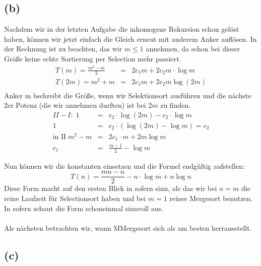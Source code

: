 \documentclass[11pt,a4paper,ngerman]{article}
\begin{document}


\subsection*{(b)}

Nachdem wir in der letzten Aufgabe die inhomogene Rekursion schon gelöst haben, können wir jetzt einfach die Gleich erneut mit anderem Anker auflösen.
In der Rechnung ist zu beachten, das wir $m \leq 1$ annehmen, da schon bei dieser Größe keine echte Sortierung per Selection mehr passiert.
$$
\begin{array}{rcl}
T(m)= \frac{m^2 - m}{2} &=&  2 c_1 m + 2 c_2 m \cdot \log m\\
T(2m) = m^2 + m &=& 2c_1 m + 2c_2 m \log (2m)\\
\end{array}
$$
Anker m bschreibt die Größe, wenn wir Selektionsort ausführen und die nächste 2er Potenz (die wir annehmen durften) ist bei $2m$ zu finden.
$$
\begin{array}{rcl}
II - I:\;1 &=& c_2 \cdot \log(2m) - c_2 \cdot \log m\\
1 &=& c_2 \cdot \left( \log (2m) - \log m\right)= c_2\\
\text{in II}\; m^2 - m &=& 2c_1 \cdot m + 2m\log m\\
c_1 &=& \frac{m-1}{2} - \log m
\end{array}
$$

Nun können wir die konstanten einsetzen und die Formel endgültig aufstellen:
$$
T(n) = \frac{mn - n}{2} - n \cdot \log m + n \log n
$$
Diese Form macht auf den ersten Blick in sofern sinn, als das wir bei $n = m$ die reine Laufzeit für Selectionsort haben und bei $m=1$ reines Mergesort benutzen. In sofern schaut die Form schoneinmal sinnvoll aus.\\
\vspace{\baselineskip}\\

Als nächsten betrachten wir, wann MMergesort sich als am besten herrausstellt.




\subsection*{(c)}
\end{document}
